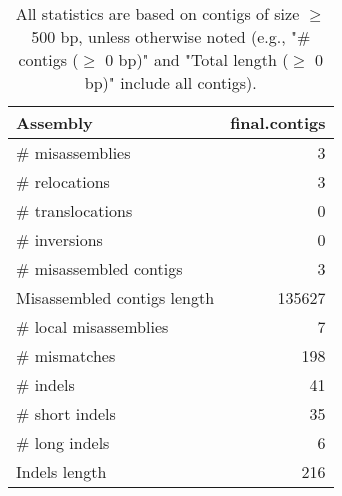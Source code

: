 \documentclass[12pt,a4paper]{article}
\begin{document}
\begin{table}[ht]
\begin{center}
\caption{All statistics are based on contigs of size $\geq$ 500 bp, unless otherwise noted (e.g., "\# contigs ($\geq$ 0 bp)" and "Total length ($\geq$ 0 bp)" include all contigs).}
\begin{tabular}{|l*{1}{|r}|}
\hline
Assembly & final.contigs \\ \hline
\# misassemblies & 3 \\ \hline
\hspace{5mm}\# relocations & 3 \\ \hline
\hspace{5mm}\# translocations & 0 \\ \hline
\hspace{5mm}\# inversions & 0 \\ \hline
\# misassembled contigs & 3 \\ \hline
Misassembled contigs length & 135627 \\ \hline
\# local misassemblies & 7 \\ \hline
\# mismatches & 198 \\ \hline
\# indels & 41 \\ \hline
\hspace{5mm}\# short indels & 35 \\ \hline
\hspace{5mm}\# long indels & 6 \\ \hline
Indels length & 216 \\ \hline
\end{tabular}
\end{center}
\end{table}
\end{document}
